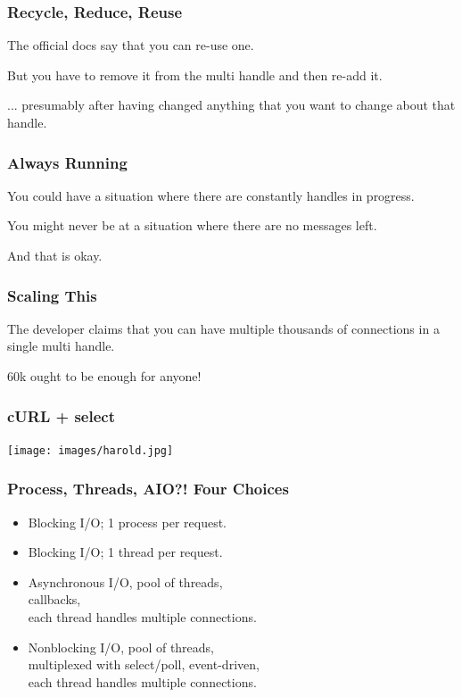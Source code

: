 \begin{frame}
	\frametitle{Recycle, Reduce, Reuse}

	The official docs say that you can re-use one.

	But you have to remove it from the multi handle and then re-add it.

	... presumably after having changed anything that you want to change about that handle.

\end{frame}


\begin{frame}
	\frametitle{Always Running}

	You could have a situation where there are constantly handles in progress.

	You might never be at a situation where there are no messages left.

	And that is okay.

\end{frame}

\begin{frame}
	\frametitle{Scaling This}

	The developer claims that you can have multiple thousands of connections in a single multi handle.

	60k ought to be enough for anyone!
\end{frame}


\begin{frame}
	\frametitle{cURL + select}
	\begin{center}
		\texttt{[image: images/harold.jpg]}
	\end{center}


\end{frame}

\begin{frame}
  \frametitle{Process, Threads, AIO?! Four Choices}

  
    \begin{itemize}
      \item Blocking I/O; 1 process per request.
      \item Blocking I/O; 1 thread per request.
      \item Asynchronous I/O, pool of threads, \\callbacks, \\ each thread handles multiple connections.
      \item Nonblocking I/O, pool of threads, \\ multiplexed with select/poll,
        event-driven, \\ each thread handles multiple connections.
    \end{itemize}
  

\end{frame}


